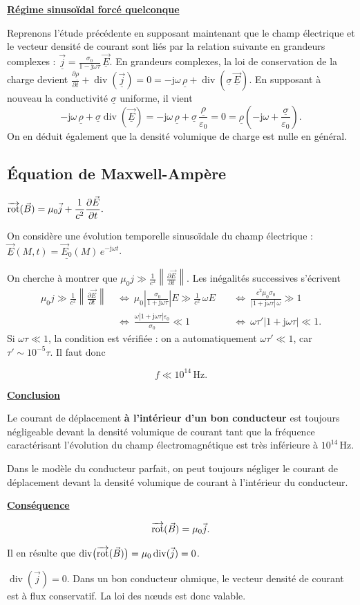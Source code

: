 \documentclass[11pt,a4paper]{article}
\newif\ifinexample
\newcommand{\dd}{\mathrm d}
\newcommand{\titr}[1]{\par\ifinexample\else\Needspace{4\baselineskip}\fi\textbf{\underline{#1}}\par\nopagebreak[3]}
\newcommand{\vj}{\vec j}\newcommand{\vE}{\vec E}\newcommand{\vB}{\vec B}
\newcommand{\divg}{\operatorname{div}}\newcommand{\sy}{\operatorname{sym}}
\newcommand{\eps}{\varepsilon_0}\newcommand{\E}{\vec E}\newcommand{\dS}{\dd\vec S}\newcommand{\dM}{\dd\vec M}
\newcommand{\cx}[1]{\underline{#1}}
\newcommand{\module}[1]{\left\lvert #1\right\rvert}
\newcommand{\norme}[1]{\left\lVert #1\right\rVert}
\newcommand{\imag}{\mathrm{j}}
\newcommand{\bmath}[1]{\begin{cadre}\[#1\]\end{cadre}}
\newcommand{\deuxcol}[3]{\par\noindent
  \begin{minipage}[c]{#1\linewidth}\centering #2\end{minipage}\hfill
  \begin{minipage}[c]{\dimexpr\linewidth-#1\linewidth-6mm\relax}#3\end{minipage}\par}
\newcommand{\unite}[1]{\,\mathrm{#1}}
\begin{document}
\titr{Régime sinusoïdal forcé quelconque}
Reprenons l'étude précédente en supposant maintenant que le champ électrique et le vecteur
densité de courant sont liés par la relation suivante en grandeurs complexes :
\(\displaystyle \cx{\vj}=\frac{\sigma_0}{1-\imag\omega\tau}\,\cx{\E}\).
En grandeurs complexes, la loi de conservation de la charge devient
\(\displaystyle \frac{\partial\cx{\rho}}{\partial t}+\divg(\cx{\vj})=0
 =-\imag\omega\,\cx{\rho}+\divg(\cx{\sigma}\,\cx{\E})\).
En supposant à nouveau la conductivité \(\cx{\sigma}\) uniforme, il vient
\[
 -\imag\omega\,\cx{\rho}+\cx{\sigma}\divg(\cx{\E})
  =-\imag\omega\,\cx{\rho}+\cx{\sigma}\,\frac{\cx{\rho}}{\eps}
  =0=\cx{\rho}\left(-\imag\omega+\frac{\cx{\sigma}}{\eps}\right).
\]
On en déduit également que la densité volumique de charge est nulle en général.

\subsection{Équation de Maxwell-Ampère}\label{sec:ampere}
\deuxcol{.40}{\(\displaystyle
 \rot(\vB)=\mu_0\vj+\frac1{c^2}\frac{\partial\E}{\partial t}.\)}{%
On considère une évolution temporelle sinusoïdale du champ électrique :
\(\cx{\E}(M,t)=\cx{\vec E_0}(M)\,e^{-\imag\omega t}\).}
On cherche à montrer que \(\displaystyle \mu_0 j\gg\frac1{c^2}\norme{\frac{\partial\E}{\partial t}}\).
Les inégalités successives s'écrivent
\[
\begin{aligned}
 \mu_0 j\gg\frac1{c^2}\norme{\frac{\partial\E}{\partial t}}
 &\ \Longleftrightarrow\
 \mu_0\module{\frac{\sigma_0}{1+\imag\omega\tau}}E \gg\frac1{c^2}\,\omega E
 &&\ \Longleftrightarrow\
   \frac{c^2\mu_0\sigma_0}{\module{1+\imag\omega\tau}\,\omega}\gg1\\[2pt]
 &\ \Longleftrightarrow\
   \frac{\omega\module{1+\imag\omega\tau}\eps}{\sigma_0}\ll1
 &&\ \Longleftrightarrow\
   \omega\tau'\module{1+\imag\omega\tau}\ll1 .
\end{aligned}
\]
Si \(\omega\tau\ll1\), la condition est vérifiée : on a automatiquement \(\omega\tau'\ll1\),
car \(\tau'\sim10^{-5}\tau\). Il faut donc
\bmath{f\ll10^{14}\unite{Hz}.}
\titr{Conclusion}
\begin{cadre}
Le courant de déplacement \textbf{à l'intérieur d'un bon conducteur} est toujours négligeable
devant la densité volumique de courant tant que la fréquence caractérisant l'évolution du champ
électromagnétique est très inférieure à \(10^{14}\unite{Hz}\).
\end{cadre}
\begin{cadre}
Dans le modèle du conducteur parfait, on peut toujours négliger le courant de déplacement
devant la densité volumique de courant à l'intérieur du conducteur.
\end{cadre}
\titr{Conséquence}
\bmath{\rot(\vB)=\mu_0\vj.}
Il en résulte que \(\divg\bigl(\rot(\vB)\bigr)=\mu_0\divg(\vj)=0\).
\begin{cadre}
\(\divg(\vj)=0\). Dans un bon conducteur ohmique, le vecteur densité de courant est à flux
conservatif. La loi des nœuds est donc valable.
\end{cadre}
\end{document}
